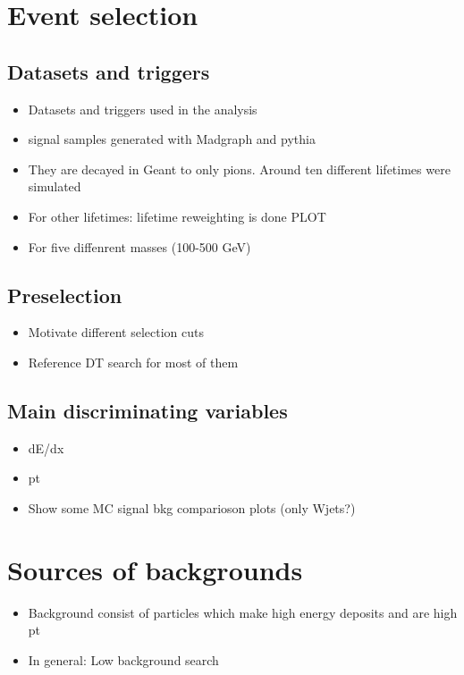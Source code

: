 \section{Event selection}
\label{sec:EventSelection}
\subsection{Datasets and triggers}
\begin{itemize}
\item Datasets and triggers used in the analysis
\item signal samples generated with Madgraph and pythia
\item They are decayed in Geant to only pions. Around ten different lifetimes were simulated
\item For other lifetimes: lifetime reweighting is done PLOT
\item For five diffenrent masses (100-500 GeV) 
\end{itemize}
\subsection{Preselection}
\begin{itemize}
\item Motivate different selection cuts
\item Reference DT search for most of them
\end{itemize}
\subsection{Main discriminating variables}
\begin{itemize}
\item dE/dx
\item pt
\item Show some MC signal bkg comparioson plots (only Wjets?)
\end{itemize}

\section{Sources of backgrounds}
\label{sec:SourcesOfBackgrounds}
\begin{itemize}
\item Background consist of particles which make high energy deposits and are high pt
\item In general: Low background search
\end{itemize}
